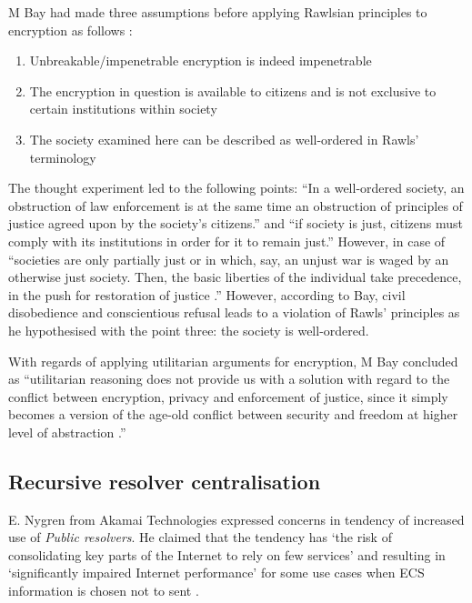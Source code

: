 M Bay had made three assumptions before applying Rawlsian principles to encryption as follows \cite{bay2017ethics}:
\begin{enumerate}
  \item Unbreakable/impenetrable encryption is indeed impenetrable
  \item The encryption in question is available to citizens and is not exclusive to certain institutions within society
  \item The society examined here can be described as well-ordered \cite{moon_2014, RawlsJohn1973Atoj} in Rawls’ terminology
\end{enumerate}
The thought experiment led to the following points: ``In a well-ordered society, an obstruction of law enforcement is at the same time an obstruction of principles of justice agreed upon by the society’s citizens.'' and  ``if society is just, citizens must comply with its institutions in order for it to remain just.''
However, in case of ``societies are only partially just or in which, say, an unjust war is waged by an otherwise just society. Then, the basic liberties of the individual take precedence, in the push for restoration of justice \cite{RawlsJohn1973Atoj}.''
However, according to Bay, civil disobedience and conscientious refusal leads to a violation of Rawls’ principles as he hypothesised with the point three: the society is well-ordered.

With regards of applying utilitarian arguments for encryption, M Bay concluded as ``utilitarian reasoning does not provide us with a solution with regard to the conflict between encryption, privacy and enforcement of justice, since it simply becomes a version of the age-old conflict between security and freedom at higher level of abstraction \cite{bay2017ethics}.''
\subsection{Recursive resolver centralisation}
E. Nygren from Akamai Technologies expressed concerns in tendency of increased use of \textit{Public resolvers}.
He claimed that the tendency has `the risk of consolidating key parts of the Internet to rely on few services' and resulting in `significantly impaired Internet performance' for some use cases when ECS information is chosen not to sent \cite{akamai-dns-architecture}.

